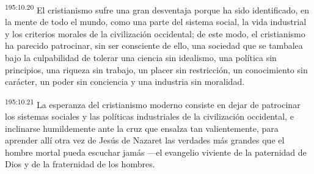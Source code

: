 \par 
\textsuperscript{195:10.20} El cristianismo sufre una gran desventaja porque ha sido identificado, en la mente de todo el mundo, como una parte del sistema social, la vida industrial y los criterios morales de la civilización occidental; de este modo, el cristianismo ha parecido patrocinar, sin ser consciente de ello, una sociedad que se tambalea bajo la culpabilidad de tolerar una ciencia sin idealismo, una política sin principios, una riqueza sin trabajo, un placer sin restricción, un conocimiento sin carácter, un poder sin conciencia y una industria sin moralidad.

\par 
\textsuperscript{195:10.21} La esperanza del cristianismo moderno consiste en dejar de patrocinar los sistemas sociales y las políticas industriales de la civilización occidental, e inclinarse humildemente ante la cruz que ensalza tan valientemente, para aprender allí otra vez de Jesús de Nazaret las verdades más grandes que el hombre mortal pueda escuchar jamás ---el evangelio viviente de la paternidad de Dios y de la fraternidad de los hombres.
